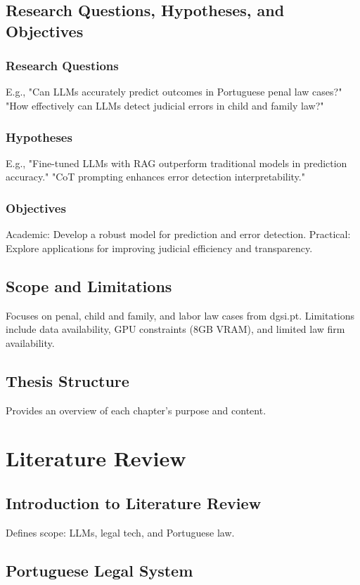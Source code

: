 \documentclass[11pt,a4paper,twoside,openright]{book}
\begin{document}
\section{Research Questions, Hypotheses, and Objectives}
\subsection{Research Questions}
E.g., "Can LLMs accurately predict outcomes in Portuguese penal law cases?" "How effectively can LLMs detect judicial errors in child and family law?"
\subsection{Hypotheses}
E.g., "Fine-tuned LLMs with RAG outperform traditional models in prediction accuracy." "CoT prompting enhances error detection interpretability."
\subsection{Objectives}
Academic: Develop a robust model for prediction and error detection. Practical: Explore applications for improving judicial efficiency and transparency.
\section{Scope and Limitations}
Focuses on penal, child and family, and labor law cases from dgsi.pt. Limitations include data availability, GPU constraints (8GB VRAM), and limited law firm availability.
\section{Thesis Structure}
Provides an overview of each chapter’s purpose and content.

\chapter{Literature Review}
\section{Introduction to Literature Review}
Defines scope: LLMs, legal tech, and Portuguese law.




\section{Portuguese Legal System}
\end{document}

